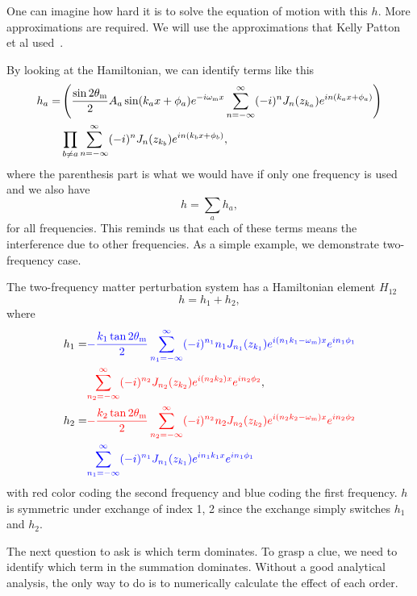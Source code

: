 One can imagine how hard it is to solve the equation of motion with this $h$. More approximations are required. We will use the approximations that Kelly Patton et al used~\cite{Patton2014}.

By looking at the Hamiltonian, we can identify terms like this
\begin{align}
   h_a =& \left( \frac{\sin 2\theta_\mathrm m}{2}  A_a \sin (k_a x + \phi_a) e^{-i\omega_\mathrm m x}  \sum_{n=-\infty}^{\infty} (-i)^n J_n (z_{k_a}) e^{i n(k_a x + \phi_a) }  \right) \nonumber \\
   &\prod_{b\neq a} \sum_{n=-\infty}^{\infty} (-i)^n J_n (z_{k_b}) e^{i n(k_b x + \phi_b) },
\end{align}
where the parenthesis part is what we would have if only one frequency is used and we also have
\begin{equation}
   h = \sum_{a} h_a,
\end{equation}
for all frequencies.
This reminds us that each of these terms means the interference due to other frequencies. As a simple example, we demonstrate two-frequency case.

The two-frequency matter perturbation system has a Hamiltonian element $H_{12}$
\begin{equation}
   h = h_1 + h_2,
\end{equation}
where
\begin{align}
   h_1  =& {\color{blue}-\frac{k_1 \tan 2\theta_\mathrm m}{2} \sum_{n_1=-\infty}^{\infty} (-i)^{n_1} n_1 J_{n_1} (z_{k_1}) e^{i (n_1 k_1-\omega_\mathrm m)x} e^{i n_1\phi_1} }  \nonumber\\
   &{\color{red}\sum_{n_2=-\infty}^{\infty} (-i)^{n_2} J_{n_2}(z_{k_2}) e^{i(n_2k_2)x} e^{i n_2 \phi_2}  }, \\
   h_2 =& {\color{red} - \frac{k_2\tan 2\theta_\mathrm m}{2} \sum_{n_2=-\infty}^{\infty} (-i)^{n_2} n_2 J_{n_2}(z_{k_2}) e^{i(n_2k_2-\omega_\mathrm m)x} e^{i n_2 \phi_2}  } \nonumber\\
   &{\color{blue} \sum_{n_1=-\infty}^{\infty} (-i)^{n_1} J_{n_1}(z_{k_1}) e^{in_1 k_1 x} e^{i n_1 \phi_1} }
\end{align}
with red color coding the second frequency and blue coding the first frequency. $h$ is symmetric under exchange of index 1, 2 since the exchange simply switches $h_1$ and $h_2$.


The next question to ask is which term dominates. To grasp a clue, we need to identify which term in the summation dominates. Without a good analytical analysis, the only way to do is to numerically calculate the effect of each order.

